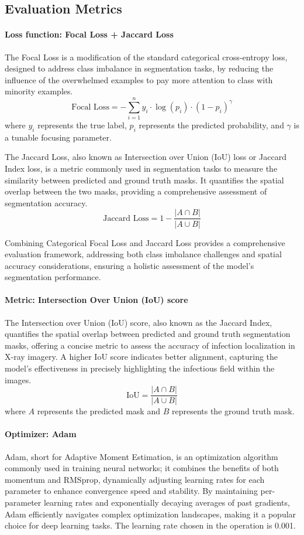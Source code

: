 \documentclass[]{acmsiggraph}
\begin{document}
\subsection{Evaluation Metrics}
\paragraph{Loss function: Focal Loss + Jaccard Loss}
The Focal Loss is a modification of the standard categorical cross-entropy loss, designed to address class imbalance in segmentation tasks, by reducing the influence of the overwhelmed examples to pay more attention to class with minority examples.
\[ \text{Focal Loss} = -\sum_{i=1}^{n} y_i \cdot \log(p_i) \cdot (1 - p_i)^{\gamma} \]
where $y_i$ represents the true label, $p_i$ represents the predicted probability, and $\gamma$ is a tunable focusing parameter.

The Jaccard Loss, also known as Intersection over Union (IoU) loss or Jaccard Index loss, is a metric commonly used in segmentation tasks to measure the similarity between predicted and ground truth masks. It quantifies the spatial overlap between the two masks, providing a comprehensive assessment of segmentation accuracy.
\[ \text{Jaccard Loss} = 1 - \frac{|A \cap B|}{|A \cup B|} \]

Combining Categorical Focal Loss and Jaccard Loss provides a comprehensive evaluation framework, addressing both class imbalance challenges and spatial accuracy considerations, ensuring a holistic assessment of the model's segmentation performance.

\paragraph{Metric: Intersection Over Union (IoU) score}
The Intersection over Union (IoU) score, also known as the Jaccard Index, quantifies the spatial overlap between predicted and ground truth segmentation masks, offering a concise metric to assess the accuracy of infection localization in X-ray imagery. A higher IoU score indicates better alignment, capturing the model's effectiveness in precisely highlighting the infectious field within the images.
\[ \text{IoU} = \frac{|A \cap B|}{|A \cup B|} \]
where $A$ represents the predicted mask and $B$ represents the ground truth mask.

\paragraph{Optimizer: Adam}
Adam, short for Adaptive Moment Estimation, is an optimization algorithm commonly used in training neural networks; it combines the benefits of both momentum and RMSprop, dynamically adjusting learning rates for each parameter to enhance convergence speed and stability. By maintaining per-parameter learning rates and exponentially decaying averages of past gradients, Adam efficiently navigates complex optimization landscapes, making it a popular choice for deep learning tasks. The learning rate chosen in the operation is 0.001.
\end{document}

